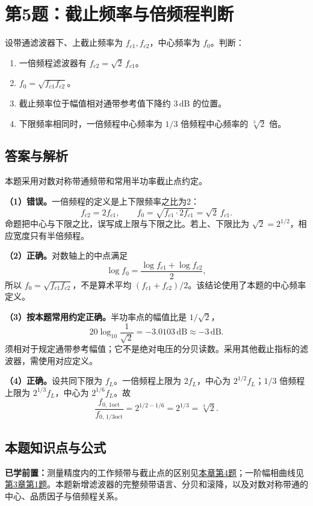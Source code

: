 
\section{第5题：截止频率与倍频程判断}
\label{hw:5-5}

\begin{hwquestion}
设带通滤波器下、上截止频率为 $f_{c1},f_{c2}$，中心频率为 $f_0$。判断：
\begin{enumerate}
\item 一倍频程滤波器有 $f_{c2}=\sqrt2\,f_{c1}$。
\item $f_0=\sqrt{f_{c1}f_{c2}}$。
\item 截止频率位于幅值相对通带参考值下降约 $3\,\mathrm{dB}$ 的位置。
\item 下限频率相同时，一倍频程中心频率为 $1/3$ 倍频程中心频率的 $\sqrt[3]2$ 倍。
\end{enumerate}
\end{hwquestion}

\subsection*{答案与解析}
本题采用对数对称带通频带和常用半功率截止点约定。

\textbf{（1）错误。}一倍频程的定义是上下限频率之比为2：
\[
\boxed{f_{c2}=2f_{c1}},\qquad
f_0=\sqrt{f_{c1}\cdot2f_{c1}}=\sqrt2\,f_{c1}.
\]
命题把中心与下限之比，误写成上限与下限之比。若上、下限比为 $\sqrt2=2^{1/2}$，相应宽度只有半倍频程。

\textbf{（2）正确。}对数轴上的中点满足
\[
\log f_0=\frac{\log f_{c1}+\log f_{c2}}2,
\]
所以 $f_0=\sqrt{f_{c1}f_{c2}}$，不是算术平均 $(f_{c1}+f_{c2})/2$。该结论使用了本题的中心频率定义。

\textbf{（3）按本题常用约定正确。}半功率点的幅值比是 $1/\sqrt2$，
\[
20\log_{10}\frac{1}{\sqrt2}=-3.0103\,\mathrm{dB}\approx-3\,\mathrm{dB}.
\]
须相对于规定通带参考幅值；它不是绝对电压的分贝读数。采用其他截止指标的滤波器，需使用对应定义。

\textbf{（4）正确。}设共同下限为 $f_L$。一倍频程上限为 $2f_L$，中心为 $2^{1/2}f_L$；$1/3$ 倍频程上限为 $2^{1/3}f_L$，中心为 $2^{1/6}f_L$。故
\[
\boxed{\frac{f_{0,\,1\mathrm{oct}}}{f_{0,\,1/3\mathrm{oct}}}
=2^{1/2-1/6}=2^{1/3}=\sqrt[3]2}.
\]


\subsection*{本题知识点与公式}\label{kn:5-5}
\noindent\textbf{已学前置：}测量精度内的工作频带与截止点的区别见\hyperref[kn:5-4]{本章第4题}；一阶幅相曲线见\hyperref[kn:3-1]{第3章第1题}。本题新增滤波器的完整频带语言、分贝和滚降，以及对数对称带通的中心、品质因子与倍频程关系。

